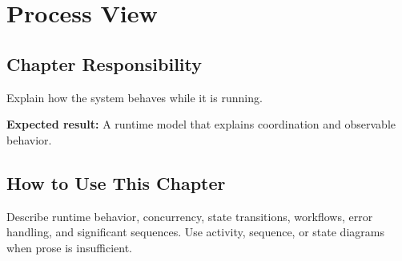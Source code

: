 \chapter{Process View}
\section{Chapter Responsibility}
\label{Section:ProcessViewResponsibility}
Explain how the system behaves while it is running.

\noindent\textbf{Expected result:} A runtime model that explains coordination and observable behavior.

\section{How to Use This Chapter}
Describe runtime behavior, concurrency, state transitions, workflows, error handling, and significant sequences. Use activity, sequence, or state diagrams when prose is insufficient.
